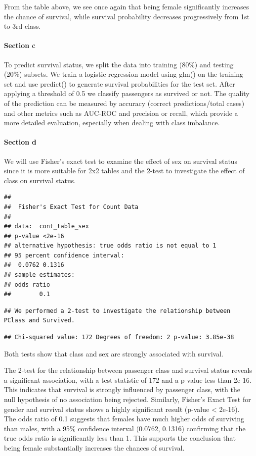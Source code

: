 \documentclass[
  11pt,
]{article}
\begin{document}
From the table above, we see once again that being female significantly
increases the chance of survival, while survival probability decreases
progressively from 1st to 3rd class.

\paragraph{Section c}\label{section-c}

To predict survival status, we split the data into training (80\%) and
testing (20\%) subsets. We train a logistic regression model using glm()
on the training set and use predict() to generate survival probabilities
for the test set. After applying a threshold of 0.5 we classify
passengers as survived or not. The quality of the prediction can be
measured by accuracy (correct predictions/total cases) and other metrics
such as AUC-ROC and precision or recall, which provide a more detailed
evaluation, especially when dealing with class imbalance.

\paragraph{Section d}\label{section-d}

We will use Fisher's exact test to examine the effect of sex on survival
status since it is more suitable for 2x2 tables and the 2-test to
investigate the effect of class on survival status.

\begin{verbatim}
## 
##  Fisher's Exact Test for Count Data
## 
## data:  cont_table_sex
## p-value <2e-16
## alternative hypothesis: true odds ratio is not equal to 1
## 95 percent confidence interval:
##  0.0762 0.1316
## sample estimates:
## odds ratio 
##        0.1
\end{verbatim}

\begin{verbatim}
## We performed a 2-test to investigate the relationship between PClass and Survived.
\end{verbatim}

\begin{verbatim}
## Chi-squared value: 172 Degrees of freedom: 2 p-value: 3.85e-38
\end{verbatim}

Both tests show that class and sex are strongly associated with
survival.

The 2-test for the relationship between passenger class and survival
status reveals a significant association, with a test statistic of 172
and a p-value less than 2e-16. This indicates that survival is strongly
influenced by passenger class, with the null hypothesis of no
association being rejected. Similarly, Fisher's Exact Test for gender
and survival status shows a highly significant result (p-value
\textless{} 2e-16). The odds ratio of 0.1 suggests that females have
much higher odds of surviving than males, with a 95\% confidence
interval (0.0762, 0.1316) confirming that the true odds ratio is
significantly less than 1. This supports the conclusion that being
female substantially increases the chances of survival.
\end{document}
